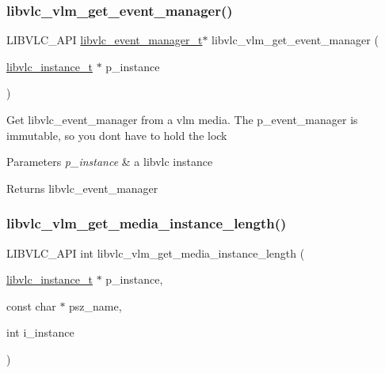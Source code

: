 \subsubsection{\texorpdfstring{libvlc\+\_\+vlm\+\_\+get\+\_\+event\+\_\+manager()}{libvlc\_vlm\_get\_event\_manager()}}
{\footnotesize\ttfamily L\+I\+B\+V\+L\+C\+\_\+\+A\+PI \hyperlink{group__libvlc__event_gaa82f247503d3558b9117550e8d3c9259}{libvlc\+\_\+event\+\_\+manager\+\_\+t}$\ast$ libvlc\+\_\+vlm\+\_\+get\+\_\+event\+\_\+manager (\begin{DoxyParamCaption}\item[{\hyperlink{group__libvlc__core_ga316d739a80da4678206c79f4d6c2e284}{libvlc\+\_\+instance\+\_\+t} $\ast$}]{p\+\_\+instance }\end{DoxyParamCaption})}

Get libvlc\+\_\+event\+\_\+manager from a vlm media. The p\+\_\+event\+\_\+manager is immutable, so you don\textquotesingle{}t have to hold the lock


\begin{DoxyParams}{Parameters}
{\em p\+\_\+instance} & a libvlc instance \\
\hline
\end{DoxyParams}
\begin{DoxyReturn}{Returns}
libvlc\+\_\+event\+\_\+manager 
\end{DoxyReturn}
\mbox{\label{group__libvlc__vlm_ga5d8b7bd36576ea8b7ea7910359ba4b5a}} 
\subsubsection{\texorpdfstring{libvlc\+\_\+vlm\+\_\+get\+\_\+media\+\_\+instance\+\_\+length()}{libvlc\_vlm\_get\_media\_instance\_length()}}
{\footnotesize\ttfamily L\+I\+B\+V\+L\+C\+\_\+\+A\+PI int libvlc\+\_\+vlm\+\_\+get\+\_\+media\+\_\+instance\+\_\+length (\begin{DoxyParamCaption}\item[{\hyperlink{group__libvlc__core_ga316d739a80da4678206c79f4d6c2e284}{libvlc\+\_\+instance\+\_\+t} $\ast$}]{p\+\_\+instance,  }\item[{const char $\ast$}]{psz\+\_\+name,  }\item[{int}]{i\+\_\+instance }\end{DoxyParamCaption})}

